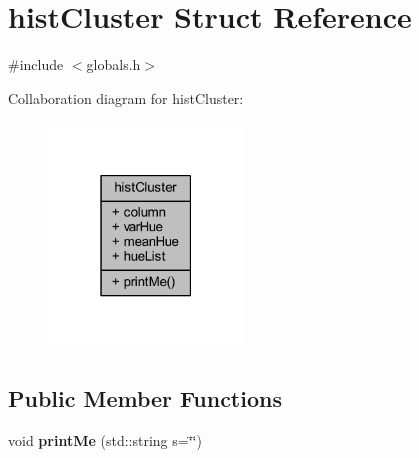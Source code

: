 \hypertarget{structhist_cluster}{}\section{hist\+Cluster Struct Reference}
\label{structhist_cluster}


{\ttfamily \#include $<$globals.\+h$>$}



Collaboration diagram for hist\+Cluster\+:
\nopagebreak
\begin{figure}[H]
\begin{center}
\leavevmode
\includegraphics[width=147pt]{structhist_cluster__coll__graph}
\end{center}
\end{figure}
\subsection*{Public Member Functions}
\begin{DoxyCompactItemize}
\item 
\mbox{\label{structhist_cluster_ad101156d19fc78ca6e33e3c08e98bb39}} 
void {\bfseries print\+Me} (std\+::string s=\char`\"{}\char`\"{})
\end{DoxyCompactItemize}
